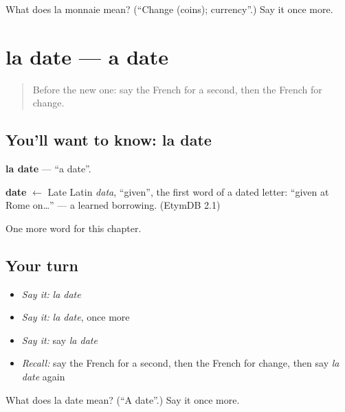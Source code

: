 \begin{tcolorbox}[breakable,colback=teal!4,colframe=teal!35!black,title={Before you move on}]
What does la monnaie mean? (\textquotedblleft{}Change (coins); currency\textquotedblright{}.) Say it once more.
\end{tcolorbox}
\section[la date]{la date — a date}

\label{lesson:FR-C135-date}



\begin{quote}
Before the new one: say the French for a second, then the French for change.
\end{quote}

\subsection*{You'll want to know: la date}
\textbf{la date} — \textquotedblleft{}a date\textquotedblright{}.

\begin{cousinweb}
\textbf{date} $\leftarrow$ Late Latin \emph{data}, \textquotedblleft{}given\textquotedblright{}, the first word of a dated letter: \textquotedblleft{}given at Rome on…\textquotedblright{} — a learned borrowing. (EtymDB 2.1)
\end{cousinweb}

\begin{grammarlens}[title={What you've built}]
One more word for this chapter.
\end{grammarlens}

\subsection*{Your turn}
\begin{itemize}
\raggedright
  \item \emph{Say it:} \emph{la date}
  \item \emph{Say it:} \emph{la date}, once more
  \item \emph{Say it:} say \emph{la date}
  \item \emph{Recall:} say the French for a second, then the French for change, then say \emph{la date} again
\end{itemize}

\begin{tcolorbox}[breakable,colback=teal!4,colframe=teal!35!black,title={Before you move on}]
What does la date mean? (\textquotedblleft{}A date\textquotedblright{}.) Say it once more.
\end{tcolorbox}
